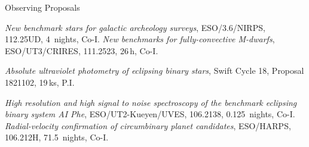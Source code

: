 \begin{rubric}{Observing Proposals}

\entry*[2023]
    \textit{New benchmark stars for galactic archeology surveys}, ESO/3.6/NIRPS, 112.25UD, 4~nights, Co-I.
\entry*[2023]
    \textit{New benchmarks for fully-convective M-dwarfs}, ESO/UT3/CRIRES, 111.2523, 26\,h, Co-I.

\entry*[2022]
    \textit{Absolute ultraviolet photometry of eclipsing binary stars}, Swift Cycle 18, Proposal 1821102, 19\,ks, P.I.

\entry*[2020]
    \textit{High resolution and high signal to noise spectroscopy of the benchmark eclipsing binary system AI Phe}, ESO/UT2-Kueyen/UVES, 106.2138, 0.125~nights, Co-I.
\entry*[2020]
    \textit{Radial-velocity confirmation of circumbinary planet candidates}, ESO/HARPS, 106.212H, 71.5~nights, Co-I.
    
\end{rubric}